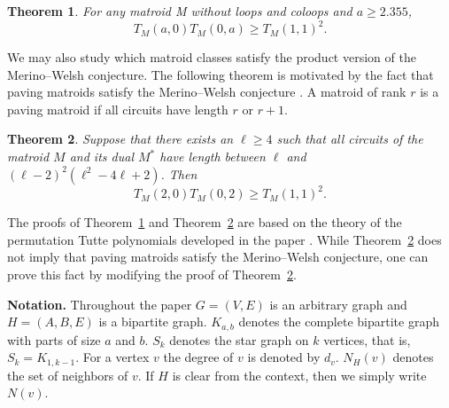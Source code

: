 \documentclass[12pt,a4paper]{amsart}
\numberwithin{equation}{section}
\theoremstyle{plain}
\newtheorem{Th}{Theorem}[section]
\theoremstyle{definition}
\newcommand{\1}{\textbf{1}}
\begin{document}
\begin{Th} \label{main theorem}
For any matroid M without loops and coloops and $a\geqslant2.355$,
\begin{equation*}
T_M(a,0)T_M(0,a) \geqslant T_M(1,1)^2.
\end{equation*}
\end{Th}

We may also study which matroid classes satisfy the product version of the Merino--Welsh conjecture. The following theorem is motivated by the fact that paving matroids satisfy the Merino--Welsh conjecture \cite{chavez2011some,ferroni2023merino}. A matroid of rank $r$ is a paving matroid if all circuits have length $r$ or $r+1$. 

\begin{Th} \label{circuit length}
Suppose that there exists an $\ell\geqslant 4$ such that all circuits of the matroid $M$ and its dual $M^*$ have length between $\ell$ and $(\ell-2)^2(\ell^2-4\ell+2)$. Then
$$T_M(2,0)T_M(0,2)\geqslant T_M(1,1)^2.$$
\end{Th}



The proofs of Theorem~\ref{main theorem} and Theorem~\ref{circuit length} are based on the theory of the permutation Tutte polynomials developed in the paper \cite{beke2024permutation}. While Theorem~\ref{circuit length} does not imply that paving matroids satisfy the Merino--Welsh conjecture,  one can prove this fact by modifying the proof of Theorem~\ref{circuit length}. 
\bigskip

\noindent \textbf{Notation.} Throughout the paper $G=(V,E)$ is an arbitrary graph and $H=(A,B,E)$ is a bipartite graph. $K_{a,b}$ denotes the complete bipartite graph with parts of size $a$ and $b$. $S_k$ denotes the star graph on $k$ vertices, that is, $S_k=K_{1,k-1}$. For a vertex $v$ the degree of $v$ is denoted by $d_v$. $N_H(v)$ denotes the set of neighbors of $v$. If $H$ is clear from the context, then we simply write $N(v)$.

\bigskip
\end{document}
